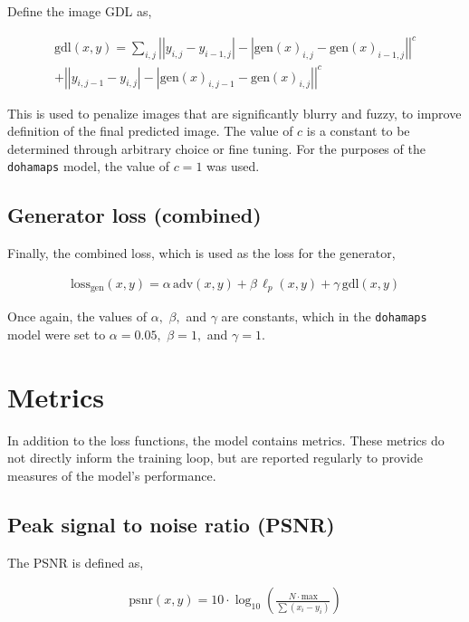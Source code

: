 \documentclass{article}
\begin{document}
Define the image GDL as,

\begin{align*}
    \mathrm{gdl}(x, y) = \sum_{i, j}\left||y_{i, j} - y_{i - 1, j}| -
    |\mathrm{gen}(x)_{i, j} - \mathrm{gen}(x)_{i - 1, j}|\right|^c\\
    + \left||y_{i, j - 1} - y_{i, j}| -
    |\mathrm{gen}(x)_{i, j - 1} - \mathrm{gen}(x)_{i, j}|\right|^c
\end{align*}

This is used to penalize images that are significantly blurry and fuzzy, to improve definition of the final predicted image. The value of $c$ is a constant to be determined through arbitrary choice or fine tuning. For the purposes of the \texttt{dohamaps} model, the value of $c = 1$ was used.

\subsection{Generator loss (combined)}

Finally, the combined loss, which is used as the loss for the generator,

\begin{align*}
    \mathrm{loss}_{\mathrm{gen}}(x, y) = \alpha\, \mathrm{adv}(x, y) +
    \beta\, \mathrm{\ell}_p(x, y) + \gamma\, \mathrm{gdl}(x, y)
\end{align*}

Once again, the values of $\alpha,$ $\beta,$ and $\gamma$ are constants, which in the \texttt{dohamaps} model were set to $\alpha = 0.05,$ $\beta = 1,$ and $\gamma = 1$.

\section{Metrics}

In addition to the loss functions, the model contains metrics. These metrics do not directly inform the training loop, but are reported regularly to provide measures of the model's performance.

\subsection{Peak signal to noise ratio (PSNR)}

The PSNR is defined as,

\begin{align*}
    \mathrm{psnr}(x, y) = 10 \cdot \log_{10}\left( \frac{N \cdot
    \mathrm{max}}{\sum (x_i - y_i)} \right)
\end{align*}
\end{document}
